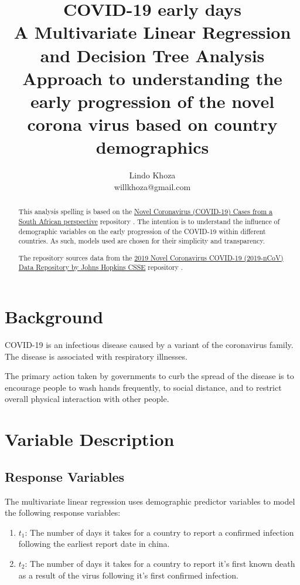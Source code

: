 \documentclass[]{report}
\title{COVID-19 early days \\ \large A Multivariate Linear Regression and Decision Tree Analysis \\ Approach to understanding the early progression of the novel corona virus based on country demographics}
\author{Lindo Khoza \\ willkhoza@gmail.com}
\begin{document}
\maketitle

\begin{abstract}
This analysis spelling is based on the \href{https://github.com/willkhoza/COVID_SA}{Novel Coronavirus (COVID-19) Cases from a South African perspective} repository \cite{covidsa}. The intention is to understand the influence of demographic variables on the early progression of the COVID-19 within different countries. As such, models used are chosen for their simplicity and transparency.

The repository sources data from the \href{https://github.com/CSSEGISandData/COVID-19}{2019 Novel Coronavirus COVID-19 (2019-nCoV) Data Repository by Johns Hopkins CSSE} repository \cite{jhu}.
\end{abstract}

\section*{Background}

COVID-19 is an infectious disease caused by a variant of the coronavirus family. The disease is associated with respiratory illnesses.

The primary action taken by governments to curb the spread of the disease is to encourage people to wash hands frequently, to social distance, and to restrict overall physical interaction with other people.

\section{Variable Description}

\subsection{Response Variables}

The multivariate linear regression uses demographic predictor variables to model the following response variables:


\begin{enumerate}
	\item $t_1$: The number of days it takes for a country to report a confirmed infection following the earliest report date in china.
	\item $t_2$: The number of days it takes for a country to report it's first known death as a result of the virus following it's first confirmed infection.
\end{enumerate}
\end{document}
